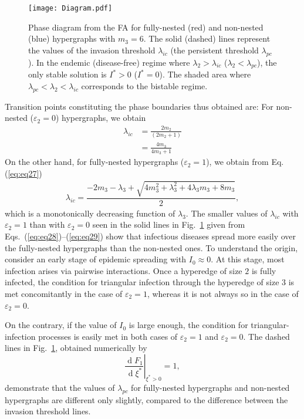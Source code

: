 \documentclass[aps,pre,twocolumn,nofootinbib,superscriptaddress,showpacs,showkeys]{revtex4-1}
\begin{document}
\begin{figure}    
\centering
    \texttt{[image: Diagram.pdf]}
    \caption{Phase diagram from the FA for fully-nested (red) and non-nested (blue) hypergraphs with $m_3=6$. The solid (dashed) lines represent the values of the invasion threshold $\lambda_{ic}$ (the persistent threshold $\lambda_{pc}$). In the endemic (disease-free) regime where $\lambda_2>\lambda_{ic}$ ($\lambda_2<\lambda_{pc}$), the only stable solution is $I^*>0$ ($I^*=0$). The shaded area where $\lambda_{pc}<\lambda_2<\lambda_{ic}$ corresponds to the bistable regime.}
    \label{fig:Fig3}
\end{figure}

Transition points constituting the phase boundaries  thus obtained are: For non-nested ($\varepsilon_2=0$) hypergraphs, we obtain
\begin{align}
\lambda_{ic}&=\frac{2m_2}{(2m_2+1)}\nonumber
\\
&=\frac{4m_3}{4m_3+1}
\label{eq:eq28}
\end{align}
On the other hand, for fully-nested hypergraphs ($\varepsilon_2=1$), we obtain from Eq. (\ref{eq:eq27})
\begin{equation}
\begin{array}{ll}
    \lambda_{ic}=\dfrac{-2m_3-\lambda_3+\sqrt{4m_{3}^{2}+\lambda_{3}^{2}+4\lambda_{3}m_3+8m_3}}{2},
\label{eq:eq29}
\end{array}
\end{equation}
which is a monotonically decreasing function of $\lambda_{3}$. The smaller values of $\lambda_{ic}$ with $\varepsilon_2=1$ than with $\varepsilon_2=0$ seen in
the solid lines in Fig.~\ref{fig:Fig3} given from Eqs.~(\ref{eq:eq28})--(\ref{eq:eq29}) show that infectious diseases spread more easily over the fully-nested hypergraphs than the non-nested ones. To understand the origin, consider an early stage of epidemic spreading with $I_{0}\approx0$. At this stage, most infection arises via pairwise interactions. Once a hyperedge of size $2$ is fully infected, the condition for triangular infection through the hyperedge of size $3$ is met concomitantly in the case of $\varepsilon_{2}=1$, whereas it is not always so in the case of $\varepsilon_2=0$.  

On the contrary, if the value of $I_0$ is large enough, the condition for triangular-infection processes is easily met in both cases of $\varepsilon_{2}=1$ and $\varepsilon_{2}=0$. The dashed lines in Fig.~\ref{fig:Fig3}, obtained numerically by
\begin{equation}
\left.{\frac{\operatorname{d}\!F_1}{\operatorname{d}\!\xi^{*}}}\right|_{\xi^{*}>0}=1,
\end{equation}
demonstrate that the values of $\lambda_{pc}$ for fully-nested hypergraphs and non-nested hypergraphs are different only slightly, compared to the difference between the invasion threshold lines. 
\end{document}
